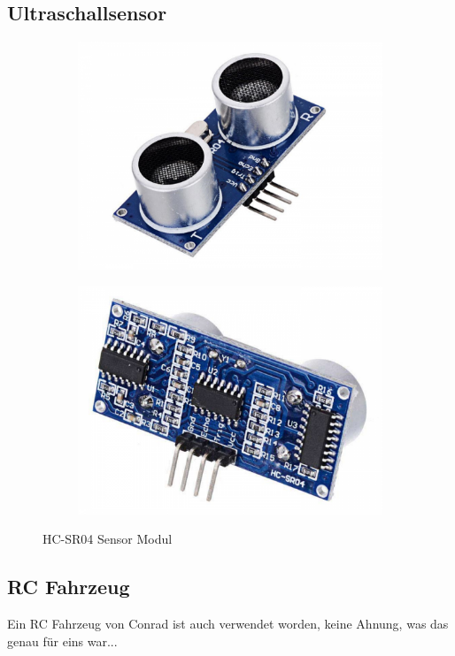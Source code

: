   \subsection{Ultraschallsensor}

    \begin{figure}[H]
    \center
    \begin{subfigure}{.5\textwidth}
      \centering
      \includegraphics[width=.8\linewidth]{images/hw_hcsr04_01.png}
    \end{subfigure}%
    \begin{subfigure}{.5\textwidth}
      \centering
      \includegraphics[width=.8\linewidth]{images/hw_hcsr04_02.png}
    \end{subfigure}
      \caption{HC-SR04 Sensor Modul}
      \label{fig:img-hw-03}
    \end{figure}
    \vspace{0.5cm}

  \subsection{RC Fahrzeug}

    Ein RC Fahrzeug von Conrad ist auch verwendet worden, keine Ahnung, was das
    genau für eins war...
    \ \\
